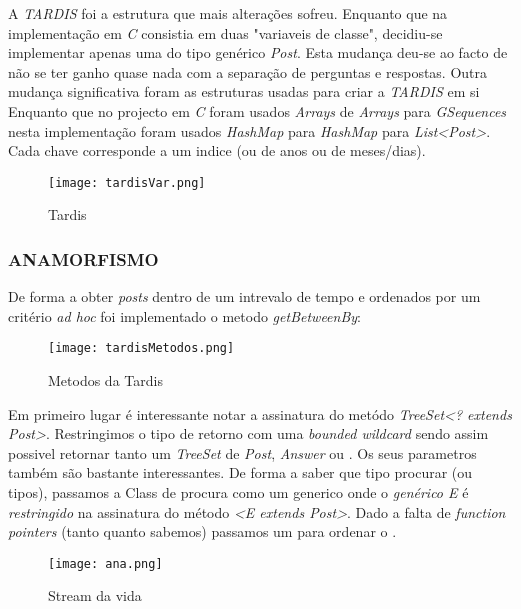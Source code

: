 \documentclass[letterpaper, 10 pt, conference]{IEEEtran} %
\begin{document}
A \textit{TARDIS} foi a estrutura que mais alterações sofreu.
Enquanto que na implementação em \textit{C} consistia em duas "variaveis de classe", decidiu-se implementar apenas uma do tipo genérico \textit{Post}. Esta mudança deu-se ao facto de não se ter ganho quase nada com a separação de perguntas e respostas.
Outra mudança significativa foram as estruturas usadas para criar a \textit{TARDIS} em si Enquanto que no projecto em \textit{C} foram usados \textit{Arrays} de \textit{Arrays} para \textit{GSequences} nesta implementação foram usados \textit{HashMap} para \textit{HashMap} para \textit{List<Post>}. Cada chave corresponde a um indice (ou de anos ou de meses/dias).

\begin{figure}[h!]
  \centering
  \texttt{[image: tardisVar.png]}
   \caption{Tardis}
\end{figure}

\subsubsection{ANAMORFISMO}

De forma a obter \textit{posts} dentro de um intrevalo de tempo e ordenados por um critério \textit{ad hoc}  foi implementado o metodo \textit{getBetweenBy}:

\begin{figure}[h!]
  \centering
  \texttt{[image: tardisMetodos.png]}
   \caption{Metodos da Tardis}
\end{figure}


Em primeiro lugar é interessante notar a assinatura do metódo \textit{TreeSet<? extends Post>}. Restringimos o tipo de retorno com uma \textit{bounded wildcard} sendo assim possivel retornar tanto um \textit{TreeSet} de \textit{Post}, \textit{Answer} ou .
Os seus parametros também são bastante interessantes. De forma a saber que tipo procurar (ou tipos), passamos a Class de procura como um generico  onde o \textit{genérico E} é \textit{restringido} na assinatura do método \textit{<E extends Post>}.
Dado a falta de \textit{function pointers} (tanto quanto sabemos) passamos um  para ordenar o .

\begin{figure}[h!]
  \centering
  \texttt{[image: ana.png]}
   \caption{Stream da vida}
\end{figure}
\end{document}
